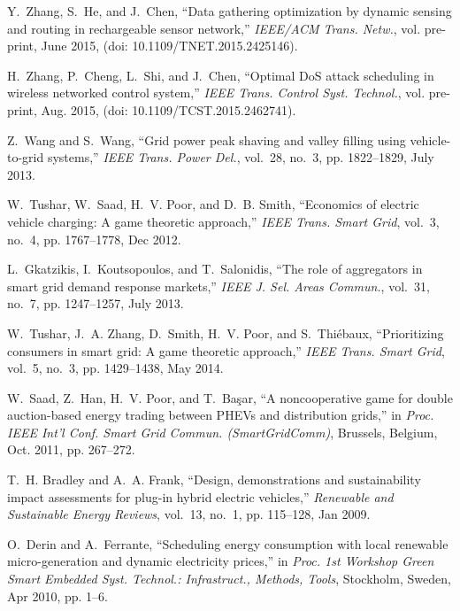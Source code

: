 \documentclass[journal,10pt]{IEEEtran}
\begin{document}
\begin{thebibliography}{10}
Y.~Zhang, S.~He, and J.~Chen, ``Data gathering optimization by dynamic sensing
  and routing in rechargeable sensor network,'' \emph{IEEE/ACM Trans. Netw.},
  vol. pre-print, June 2015, (doi: 10.1109/TNET.2015.2425146).

H.~Zhang, P.~Cheng, L.~Shi, and J.~Chen, ``Optimal {DoS} attack scheduling in
  wireless networked control system,'' \emph{IEEE Trans. Control Syst.
  Technol.}, vol. pre-print, Aug. 2015, (doi: 10.1109/TCST.2015.2462741).

Z.~Wang and S.~Wang, ``Grid power peak shaving and valley filling using
  vehicle-to-grid systems,'' \emph{IEEE Trans. Power Del.}, vol.~28, no.~3, pp.
  1822--1829, July 2013.

W.~Tushar, W.~Saad, H.~V. Poor, and D.~B. Smith, ``Economics of electric
  vehicle charging: {A} game theoretic approach,'' \emph{IEEE Trans. Smart
  Grid}, vol.~3, no.~4, pp. 1767--1778, Dec 2012.

L.~Gkatzikis, I.~Koutsopoulos, and T.~Salonidis, ``The role of aggregators in
  smart grid demand response markets,'' \emph{IEEE J. Sel. Areas Commun.},
  vol.~31, no.~7, pp. 1247--1257, July 2013.

W.~Tushar, J.~A. Zhang, D.~Smith, H.~V. Poor, and S.~Thi{\'{e}}baux,
  ``Prioritizing consumers in smart grid: {A} game theoretic approach,''
  \emph{IEEE Trans. Smart Grid}, vol.~5, no.~3, pp. 1429--1438, May 2014.

W.~Saad, Z.~Han, H.~V. Poor, and T.~Ba{\c{s}}ar, ``A noncooperative game for
  double auction-based energy trading between {PHEVs} and distribution grids,''
  in \emph{Proc. IEEE Int'l Conf. Smart Grid Commun. (SmartGridComm)},
  Brussels, Belgium, Oct. 2011, pp. 267--272.

T.~H. Bradley and A.~A. Frank, ``Design, demonstrations and sustainability
  impact assessments for plug-in hybrid electric vehicles,'' \emph{Renewable
  and Sustainable Energy Reviews}, vol.~13, no.~1, pp. 115--128, Jan 2009.

O.~Derin and A.~Ferrante, ``Scheduling energy consumption with local renewable
  micro-generation and dynamic electricity prices,'' in \emph{Proc. 1st
  Workshop Green Smart Embedded Syst. Technol.: Infrastruct., Methods, Tools},
  Stockholm, Sweden, Apr 2010, pp. 1--6.


\end{thebibliography}
\end{document}
